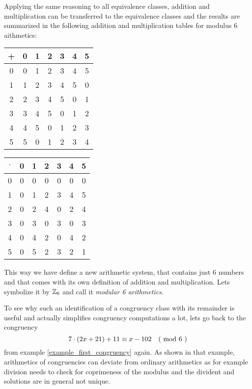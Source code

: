 \begin{example} 
Applying the same reasoning to all equivalence classes, addition and multiplication can  be transferred to the equivalence classes and the results are summarized in the following addition and multiplication tables for modulus $6$ aithmetics:
\begin{center}
  \begin{tabular}{c | c c c c c c}
    + & 0 & 1 & 2 & 3 & 4 & 5\\\hline
    0 & 0 & 1 & 2 & 3 & 4 & 5 \\
    1 & 1 & 2 & 3 & 4 & 5 & 0\\
    2 & 2 & 3 & 4 & 5 & 0 & 1\\
    3 & 3 & 4 & 5 & 0 & 1 & 2\\
    4 & 4 & 5 & 0 & 1 & 2 & 3\\
    5 & 5 & 0 & 1 & 2 & 3 & 4
  \end{tabular} \quad \quad \quad \quad
  \begin{tabular}{c | c c c c c c}
$ \cdot $ & 0 & 1 & 2 & 3 & 4 & 5 \\\hline
        0 & 0 & 0 & 0 & 0 & 0 & 0\\
        1 & 0 & 1 & 2 & 3 & 4 & 5\\
        2 & 0 & 2 & 4 & 0 & 2 & 4\\
        3 & 0 & 3 & 0 & 3 & 0 & 3\\
        4 & 0 & 4 & 2 & 0 & 4 & 2\\
        5 & 0 & 5 & 2 & 3 & 2 & 1
  \end{tabular}
\end{center}
This way we have define a new arithmetic system, that contains just $6$ numbers and that comes with its own definition of addition and multiplication. Lets symbolize it by $\mathbb{Z}_6$ and call it \textit{modular 6 arithmetics}.

To see why such an identification of a congruency class with its remainder is useful and actually simplifies congruency computations a lot, lets go back to the congruency 
\begin{equation}
\label{example_congruency_two_1}
7\cdot(2x+21) + 11 \equiv x-102 \quad \text{( mod } 6 \text{ )}
\end{equation}
from example \ref{example_first_congruency} again. As shown in that example, arithmetics of congruencies can deviate from ordinary arithmetics as for example division needs to check for coprimeness of the modulus and the divident and solutions are in general not unique.


\end{example}
